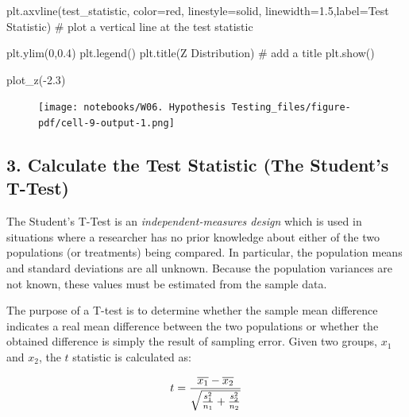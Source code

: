 \documentclass[
  letterpaper,
  DIV=11,
  numbers=noendperiod]{scrreprt}
\newenvironment{Shaded}{\begin{snugshade}}{\end{snugshade}}
\newcommand{\CommentTok}[1]{\textcolor[rgb]{0.37,0.37,0.37}{#1}}
\newcommand{\DecValTok}[1]{\textcolor[rgb]{0.68,0.00,0.00}{#1}}
\newcommand{\FloatTok}[1]{\textcolor[rgb]{0.68,0.00,0.00}{#1}}
\newcommand{\NormalTok}[1]{\textcolor[rgb]{0.00,0.23,0.31}{#1}}
\newcommand{\OperatorTok}[1]{\textcolor[rgb]{0.37,0.37,0.37}{#1}}
\newcommand{\StringTok}[1]{\textcolor[rgb]{0.13,0.47,0.30}{#1}}
\begin{document}
\begin{Shaded}
\begin{Highlighting}[]
\NormalTok{    plt.axvline(test\_statistic, color}\OperatorTok{=}\StringTok{\textquotesingle{}red\textquotesingle{}}\NormalTok{, linestyle}\OperatorTok{=}\StringTok{\textquotesingle{}solid\textquotesingle{}}\NormalTok{, linewidth}\OperatorTok{=}\FloatTok{1.5}\NormalTok{,label}\OperatorTok{=}\StringTok{\textquotesingle{}Test Statistic\textquotesingle{}}\NormalTok{) }\CommentTok{\# plot a vertical line at the test statistic}


\NormalTok{    plt.ylim(}\DecValTok{0}\NormalTok{,}\FloatTok{0.4}\NormalTok{)}
\NormalTok{    plt.legend()}
\NormalTok{    plt.title(}\StringTok{\textquotesingle{}Z Distribution\textquotesingle{}}\NormalTok{) }\CommentTok{\# add a title}
\NormalTok{    plt.show()}

\NormalTok{plot\_z(}\OperatorTok{{-}}\FloatTok{2.3}\NormalTok{)}
\end{Highlighting}
\end{Shaded}

\begin{figure}[H]

{\centering \texttt{[image: notebooks/W06. Hypothesis Testing\_files/figure-pdf/cell-9-output-1.png]}

}

\end{figure}

\hypertarget{calculate-the-test-statistic-the-students-t-test}{%
\subsection{3. Calculate the Test Statistic (The Student's
T-Test)}\label{calculate-the-test-statistic-the-students-t-test}}

The Student's T-Test is an \emph{independent-measures design} which is
used in situations where a researcher has no prior knowledge about
either of the two populations (or treatments) being compared. In
particular, the population means and standard deviations are all
unknown. Because the population variances are not known, these values
must be estimated from the sample data.

The purpose of a T-test is to determine whether the sample mean
difference indicates a real mean difference between the two populations
or whether the obtained difference is simply the result of sampling
error. Given two groups, \(x_1\) and \(x_2\), the \(t\) statistic is
calculated as:

\[ \Huge t = {\frac{\overline{x_1}-\overline{x_2}} {\sqrt{\frac{s^2_1}{n_1} + \frac{s^2_2}{n_2}}}} \]
\end{document}
